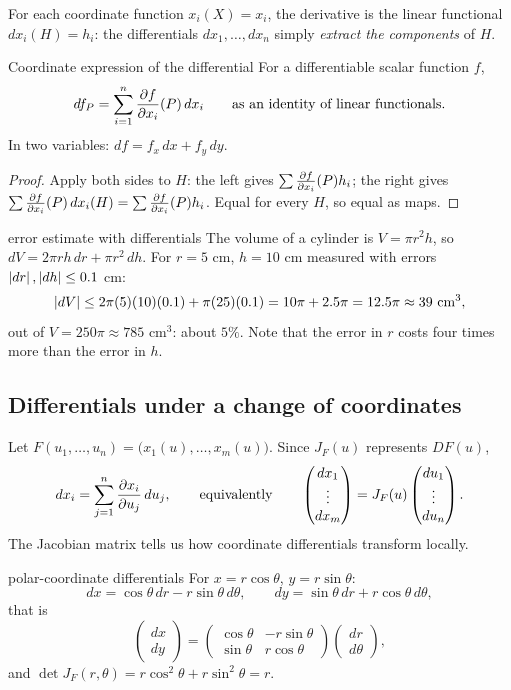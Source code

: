 For each coordinate function $x_i(X)=x_i$, the derivative is the linear functional
$dx_i(H)=h_i$: the differentials $dx_1,\dots,dx_n$ simply \emph{extract the components} of $H$.

\begin{proposition}{Coordinate expression of the differential}
For a differentiable scalar function $f$,
\[ df_P=\sum_{i=1}^n\frac{\partial f}{\partial x_i}(P)\,dx_i\qquad\text{as an identity of linear functionals.} \]
In two variables: $df=f_x\,dx+f_y\,dy$.
\end{proposition}

\begin{proof}
Apply both sides to $H$: the left gives $\sum\frac{\partial f}{\partial x_i}(P)h_i$; the right gives
$\sum\frac{\partial f}{\partial x_i}(P)\,dx_i(H)=\sum\frac{\partial f}{\partial x_i}(P)h_i$. Equal for every $H$, so equal as maps.
\end{proof}

\begin{example}{error estimate with differentials}
The volume of a cylinder is $V=\pi r^2h$, so $dV=2\pi rh\,dr+\pi r^2\,dh$. For $r=5$ cm,
$h=10$ cm measured with errors $\left\lvert dr\right\rvert,\left\lvert dh\right\rvert\le0.1$ cm:
\[ \abs{dV}\le2\pi(5)(10)(0.1)+\pi(25)(0.1)=10\pi+2.5\pi=12.5\pi\approx39\ \text{cm}^3, \]
out of $V=250\pi\approx785$ cm$^3$: about $5\%$. Note that the error in $r$ costs four times more
than the error in $h$.
\end{example}

\subsection{Differentials under a change of coordinates}

Let $F(u_1,\dots,u_n)=\big(x_1(u),\dots,x_m(u)\big)$. Since $J_F(u)$ represents $DF(u)$,
\[
dx_i=\sum_{j=1}^n\frac{\partial x_i}{\partial u_j}\,du_j,\qquad\text{equivalently}\qquad
\begin{pmatrix}dx_1\\ \vdots\\ dx_m\end{pmatrix}=J_F(u)\begin{pmatrix}du_1\\ \vdots\\ du_n\end{pmatrix}.
\]
The Jacobian matrix tells us how coordinate differentials transform locally.

\begin{example}{polar-coordinate differentials}
For $x=r\cos\theta$, $y=r\sin\theta$:
\[ dx=\cos\theta\,dr-r\sin\theta\,d\theta,\qquad dy=\sin\theta\,dr+r\cos\theta\,d\theta, \]
that is
\[
\begin{pmatrix}dx\\dy\end{pmatrix}=\begin{pmatrix}\cos\theta&-r\sin\theta\\ \sin\theta&r\cos\theta\end{pmatrix}\begin{pmatrix}dr\\d\theta\end{pmatrix},
\]
and $\det J_F(r,\theta)=r\cos^2\theta+r\sin^2\theta=r$.
\end{example}

